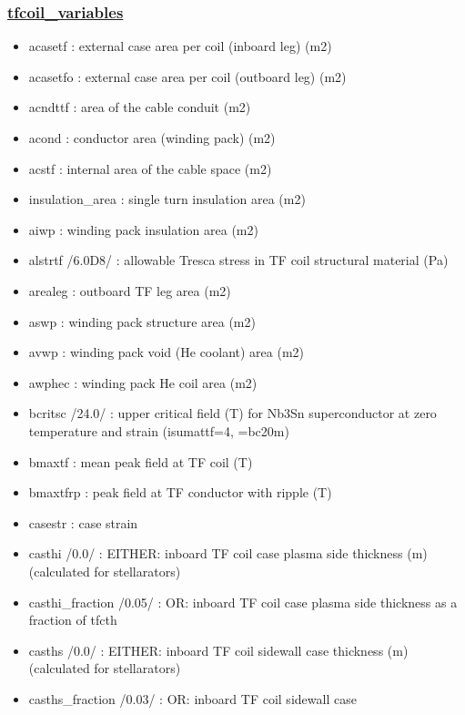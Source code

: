 \documentclass[
]{article}
\begin{document}
\begin{itemize}
  \hypertarget{tfcoil_variables}{%
  \subsubsection{\texorpdfstring{\href{tfcoil_variables.html}{tfcoil\_variables}}{tfcoil\_variables}}\label{tfcoil_variables}}

  \begin{itemize}
  \item
    acasetf : external case area per coil (inboard leg) (m2)
  \item
    acasetfo : external case area per coil (outboard leg) (m2)
  \item
    acndttf : area of the cable conduit (m2)
  \item
    acond : conductor area (winding pack) (m2)
  \item
    acstf : internal area of the cable space (m2)
  \item
    insulation\_area : single turn insulation area (m2)
  \item
    aiwp : winding pack insulation area (m2)
  \item
    alstrtf /6.0D8/ : allowable Tresca stress in TF coil structural
    material (Pa)
  \item
    arealeg : outboard TF leg area (m2)
  \item
    aswp : winding pack structure area (m2)
  \item
    avwp : winding pack void (He coolant) area (m2)
  \item
    awphec : winding pack He coil area (m2)
  \item
    bcritsc /24.0/ : upper critical field (T) for Nb3Sn superconductor
    at zero temperature and strain (isumattf=4, =bc20m)
  \item
    bmaxtf : mean peak field at TF coil (T)
  \item
    bmaxtfrp : peak field at TF conductor with ripple (T)
  \item
    casestr : case strain
  \item
    casthi /0.0/ : EITHER: inboard TF coil case plasma side thickness
    (m) (calculated for stellarators)
  \item
    casthi\_fraction /0.05/ : OR: inboard TF coil case plasma side
    thickness as a fraction of tfcth
  \item
    casths /0.0/ : EITHER: inboard TF coil sidewall case thickness (m)
    (calculated for stellarators)
  \item
    casths\_fraction /0.03/ : OR: inboard TF coil sidewall case

\end{itemize}
\end{itemize}
\end{document}

